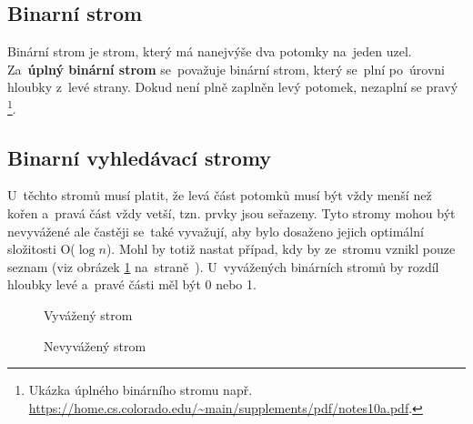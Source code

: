 \subsection{Binarní strom}

Binární strom je strom, který má nanejvýše dva potomky na~jeden uzel. Za~\textbf{úplný binární strom} se~považuje binární strom, který se~plní po~úrovni hloubky z~levé strany. Dokud není plně zaplněn levý potomek, nezaplní se pravý%
\footnote{Ukázka úplného binárního stromu např. \url{https://home.cs.colorado.edu/~main/supplements/pdf/notes10a.pdf}.}.

\subsection{Binarní vyhledávací stromy}

U~těchto stromů musí platit, že levá část potomků musí být vždy menší než kořen a~pravá část vždy vetší, tzn. prvky jsou seřazeny. Tyto stromy mohou být nevyvážené ale častěji se~také vyvažují, aby bylo dosaženo jejich optimální složitosti O(\( \log{n} \)). Mohl by totiž nastat případ, kdy by ze~stromu vznikl pouze seznam (viz obrázek \ref{noneven_binary_tree} na~straně~\pageref{noneven_binary_tree}). U~vyvážených binárních stromů by rozdíl hloubky levé a~pravé části měl být 0 nebo 1.

\begin{figure}[ht]
	\begin{minipage}[b]{0.47\textwidth}
		\centering
		\caption{Vyvážený strom}
		\label{even_binary_tree}
	\end{minipage}
	\hspace*{1em}%
	\begin{minipage}[b]{0.47\textwidth}
		\centering
		\caption{Nevyvážený strom}
		\label{noneven_binary_tree}
	\end{minipage}
\end{figure}

